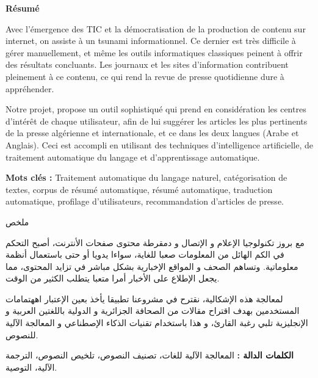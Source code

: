 \begin{center}
    \Large 
    \textbf{Résumé}
\end{center}

Avec l'émergence des TIC et la démocratisation de la production de contenu sur internet, on assiste à un tsunami informationnel. Ce dernier est très difficile à gérer manuellement, et même les outils informatiques classiques peinent à offrir des résultats concluants. Les journaux et les sites d'information contribuent pleinement à ce contenu, ce qui rend la revue de presse quotidienne dure à appréhender. 

Notre projet, propose un outil sophistiqué qui prend en considération les centres d’intérêt de chaque utilisateur, afin de lui suggérer les articles les plus pertinents de la presse algérienne et internationale, et ce dans les deux langues (Arabe et Anglais). Ceci est accompli en utilisant des techniques d'intelligence artificielle, de traitement automatique du langage et d'apprentissage automatique. 

\noindent
\textbf{Mots clés :} Traitement automatique du langage naturel, catégorisation de textes, corpus de résumé
automatique, résumé automatique, traduction automatique, profilage d'utilisateurs, recommandation d'articles de presse.  

\vspace*{0.8cm}

\begin{center}
    \Large 
    \begin{arab}
    ملخص
    \end{arab}
\end{center}
\begin{arab}
مع بروز تكنولوجيا الإعلام و الإتصال و دمقرطة محتوى صفحات الأنترنت، أصبح التحكم في الكم الهائل من المعلومات صعبا للغاية، سواءا يدويا أو حتى باستعمال أنظمة معلوماتية. وتساهم الصحف و المواقع الإخبارية بشكل مباشر في تزايد المحتوى، مما يجعل الإطلاع على الأخبار أمرا متعبا يتطلب الكثير من الوقت. 

لمعالجة هذه الإشكالية، نقترح في مشروعنا تطبيقا يأخذ بعين الإعتبار اههتمامات المستخدمين بهدف اقتراح مقالات من الصحافة الجزائرية و الدولية باللغتين العربية و الإنجليزية تلبي رغبة القارئ، و هذا باستخدام تقنيات الذكاء الإصطناعي و المعالجة الآلية للنصوص.

\textbf{الكلمات الدالة :} المعالجة الآلية للغات،  تصنيف النصوص، تلخيص النصوص، الترجمة الآلية، التوصية.  
\end{arab}

\vspace*{0.8cm}


